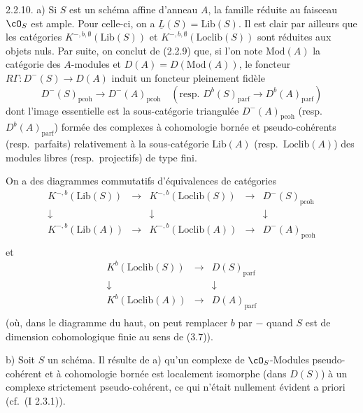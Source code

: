 \begin{remarque} 2.2.10.
a) Si $S$ est un sch\'{e}ma affine d'anneau $A$, la famille r\'{e}duite au faisceau $\cO_S$ est ample. Pour celle-ci, on a $\underline{L}(S) = \mathrm{Lib}(S)$. Il est clair par ailleurs que les cat\'{e}gories $K^{-,b,\emptyset}(\mathrm{Lib}(S))$ et $K^{-,b,\emptyset}(\mathrm{Loclib}(S))$ sont r\'{e}duites aux objets nuls. Par suite, on conclut de (2.2.9) que, si l'on note $\mathrm{Mod}(A)$ la cat\'{e}gorie des $A$-modules et $D(A) = D(\mathrm{Mod}(A))$, le foncteur $R\Gamma : D^-(S) \rightarrow D(A)$ induit un foncteur pleinement fid\`{e}le
\[
D^-(S)_{\mathrm{pcoh}} \longrightarrow D^-(A)_{\mathrm{pcoh}} \quad (\text{resp. } D^b(S)_{\mathrm{parf}} \longrightarrow D^b(A)_{\mathrm{parf}})
\]
dont l'image essentielle est la sous-cat\'{e}gorie triangul\'{e}e $D^-(A)_{\mathrm{pcoh}}$ (resp.~$D^b(A)_{\mathrm{parf}}$) form\'{e}e des complexes \`{a} cohomologie born\'{e}e et pseudo-coh\'{e}rents (resp.~parfaits) relativement \`{a} la sous-cat\'{e}gorie $\mathrm{Lib}(A)$ (resp.~$\mathrm{Loclib}(A)$) des modules libres (resp.~projectifs) de type fini.

On a des diagrammes commutatifs d'\'{e}quivalences de cat\'{e}gories
\[
\begin{array}{ccccc}
K^{-,b}(\mathrm{Lib}(S)) & \longrightarrow & K^{-,b}(\mathrm{Loclib}(S)) & \longrightarrow & D^-(S)_{\mathrm{pcoh}} \\
\downarrow & & \downarrow & & \downarrow \\
K^{-,b}(\mathrm{Lib}(A)) & \longrightarrow & K^{-,b}(\mathrm{Loclib}(A)) & \longrightarrow & D^-(A)_{\mathrm{pcoh}} \\
\end{array}
\]
et
\[
\begin{array}{ccc}
K^b(\mathrm{Loclib}(S)) & \longrightarrow & D(S)_{\mathrm{parf}} \\
\downarrow & & \downarrow \\
K^b(\mathrm{Loclib}(A)) & \longrightarrow & D(A)_{\mathrm{parf}} \\
\end{array}
\]
(o\`{u}, dans le diagramme du haut, on peut remplacer $b$ par $-$ quand $S$ est de dimension cohomologique finie au sens de (3.7)).

b) Soit $S$ un sch\'{e}ma. Il r\'{e}sulte de a) qu'un complexe de $\cO_S$-Modules pseudo-coh\'{e}rent et \`{a} cohomologie born\'{e}e est localement isomorphe (dans $D(S)$) \`{a} un complexe strictement pseudo-coh\'{e}rent, ce qui n'\'{e}tait nullement \'{e}vident a priori (cf.~(I 2.3.1)).
\end{remarque}



